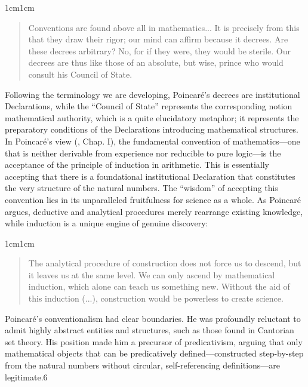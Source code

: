 \documentclass[11pt,a4paper]{article}
\begin{document}
\begin{adjustwidth}{1cm}{1cm}
\begin{quote}
\small
Conventions are found above all in mathematics... It is precisely from this that they draw their rigor; our mind can affirm because it decrees. Are these decrees arbitrary? No, for if they were, they would be sterile. Our decrees are thus like those of an absolute, but wise, prince who would consult his Council of State. \parencite[3]{Poincare1952}
\end{quote}
\end{adjustwidth}

Following the terminology we are developing, Poincaré's decrees are institutional Declarations, while the “Council of State” represents the corresponding notion mathematical authority, which is a quite elucidatory metaphor; it represents the preparatory conditions of the Declarations introducing mathematical structures. In Poincaré's view (\citeyear{Poincare1952}, Chap. I), the fundamental convention of mathematics—one that is neither derivable from experience nor reducible to pure logic—is the acceptance of the principle of induction in arithmetic. This is essentially accepting that there is a foundational institutional Declaration that constitutes the very structure of the natural numbers. The “wisdom” of accepting this convention lies in its unparalleled fruitfulness for science as a whole. As Poincaré argues, deductive and analytical procedures merely rearrange existing knowledge, while induction is a unique engine of genuine discovery: 

\begin{adjustwidth}{1cm}{1cm}
\begin{quote}
\small
The analytical procedure of construction does not force us to descend, but it leaves us at the same level. We can only ascend by mathematical induction, which alone can teach us something new. Without the aid of this induction (...), construction would be powerless to create science. \parencite[28]{Poincare1952}
\end{quote}
\end{adjustwidth}

Poincaré's conventionalism had clear boundaries. He was profoundly reluctant to admit highly abstract entities and structures, such as those found in Cantorian set theory. His position made him a precursor of predicativism, arguing that only mathematical objects that can be predicatively defined—constructed step-by-step from the natural numbers without circular, self-referencing definitions—are legitimate.6  
\end{document}
